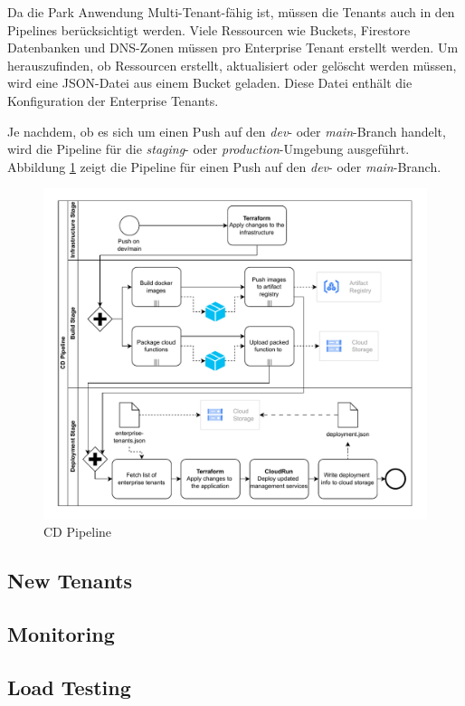 Da die Park Anwendung Multi-Tenant-fähig ist, müssen die Tenants auch in den Pipelines berücksichtigt werden.
Viele Ressourcen wie Buckets, Firestore Datenbanken und DNS-Zonen müssen pro Enterprise Tenant erstellt werden.
Um herauszufinden, ob Ressourcen erstellt, aktualisiert oder gelöscht werden müssen, wird eine JSON-Datei 
aus einem Bucket geladen. Diese Datei enthält die Konfiguration der Enterprise Tenants.

Je nachdem, ob es sich um einen Push auf den \textit{dev}- oder \textit{main}-Branch handelt, wird die Pipeline
für die \textit{staging}- oder \textit{production}-Umgebung ausgeführt.
Abbildung \ref{fig:cd-pipeline} zeigt die Pipeline für einen Push auf den \textit{dev}- oder \textit{main}-Branch.

\begin{figure}[ht]
  \centering
  \includegraphics[width=\textwidth]{resources/cd-pipeline.pdf}
  \caption{CD Pipeline}
  \label{fig:cd-pipeline}
\end{figure}



\subsection{New Tenants}
\subsection{Monitoring}
\subsection{Load Testing}